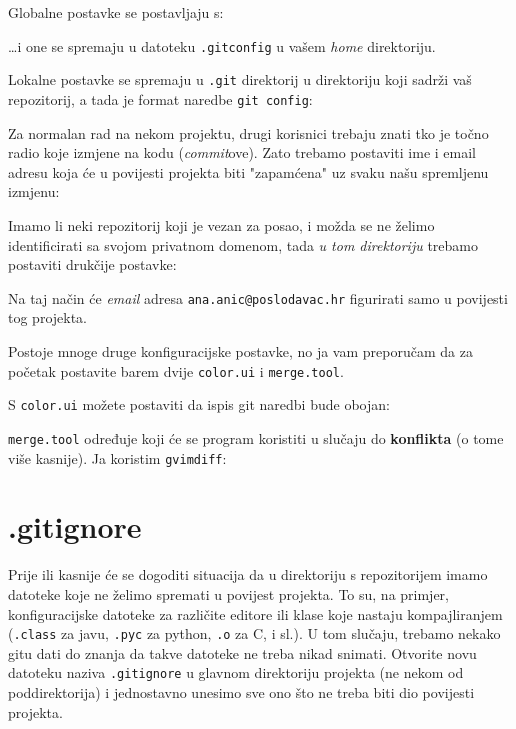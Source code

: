Globalne postavke se postavljaju s:


\dots{}i one se spremaju u datoteku \verb+.gitconfig+ u vašem \emph{home} direktoriju.

Lokalne postavke se spremaju u \verb+.git+ direktorij u direktoriju koji sadrži vaš repozitorij, a tada je format naredbe \verb+git config+:


Za normalan rad na nekom projektu, drugi korisnici trebaju znati tko je točno radio koje izmjene na kodu (\emph{commit}ove).
Zato trebamo postaviti ime i email adresu koja će u povijesti projekta biti "zapamćena" uz svaku našu spremljenu izmjenu:



Imamo li neki repozitorij koji je vezan za posao, i možda se ne želimo identificirati sa svojom privatnom domenom, tada \emph{u tom direktoriju} trebamo postaviti drukčije postavke:



Na taj način će \emph{email} adresa \verb+ana.anic@poslodavac.hr+ figurirati samo u povijesti tog projekta.

Postoje mnoge druge konfiguracijske postavke, no ja vam preporučam da za početak postavite barem dvije \verb+color.ui+ i \verb+merge.tool+.

S \verb+color.ui+ možete postaviti da ispis git naredbi bude obojan:



\verb+merge.tool+ određuje koji će se program koristiti u slučaju do \textbf{konflikta} (o tome više kasnije). Ja koristim \verb+gvimdiff+:



\section*{.gitignore}

Prije ili kasnije će se dogoditi situacija da u direktoriju s repozitorijem imamo datoteke koje ne želimo spremati u povijest projekta.
To su, na primjer, konfiguracijske datoteke za različite editore ili klase koje nastaju kompajliranjem (\verb+.class+ za javu, \verb+.pyc+ za python, \verb+.o+ za C, i sl.).
U tom slučaju, trebamo nekako gitu dati do znanja da takve datoteke ne treba nikad snimati.
Otvorite novu datoteku naziva \verb+.gitignore+ u glavnom direktoriju projekta (ne nekom od poddirektorija) i jednostavno unesimo sve ono što ne treba biti dio povijesti projekta.


